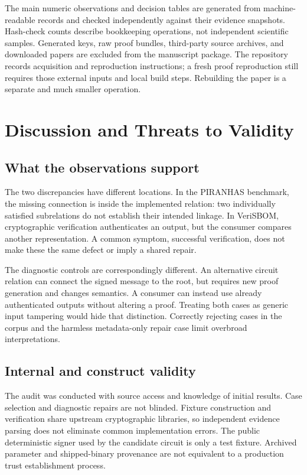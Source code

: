 \documentclass[sigconf,nonacm]{acmart}
\begin{document}
The main numeric observations and decision tables are generated from machine-readable records and checked independently against their evidence snapshots. Hash-check counts describe bookkeeping operations, not independent scientific samples. Generated keys, raw proof bundles, third-party source archives, and downloaded papers are excluded from the manuscript package. The repository records acquisition and reproduction instructions; a fresh proof reproduction still requires those external inputs and local build steps. Rebuilding the paper is a separate and much smaller operation.

\section{Discussion and Threats to Validity}
\subsection{What the observations support}
The two discrepancies have different locations. In the PIRANHAS benchmark, the missing connection is inside the implemented relation: two individually satisfied subrelations do not establish their intended linkage. In VeriSBOM, cryptographic verification authenticates an output, but the consumer compares another representation. A common symptom, successful verification, does not make these the same defect or imply a shared repair.

The diagnostic controls are correspondingly different. An alternative circuit relation can connect the signed message to the root, but requires new proof generation and changes semantics. A consumer can instead use already authenticated outputs without altering a proof. Treating both cases as generic input tampering would hide that distinction. Correctly rejecting cases in the corpus and the harmless metadata-only repair case limit overbroad interpretations.

\subsection{Internal and construct validity}
The audit was conducted with source access and knowledge of initial results. Case selection and diagnostic repairs are not blinded. Fixture construction and verification share upstream cryptographic libraries, so independent evidence parsing does not eliminate common implementation errors. The public deterministic signer used by the candidate circuit is only a test fixture. Archived parameter and shipped-binary provenance are not equivalent to a production trust establishment process.
\end{document}
